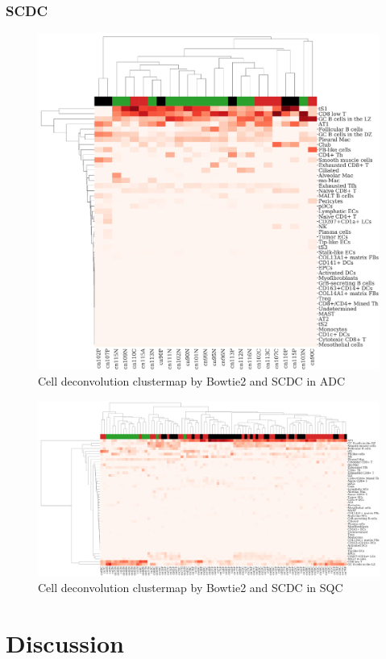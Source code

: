 \documentclass[a4paper]{article}
\begin{document}
            \subsubsection{SCDC}
                \begin{figure}[htbp]
                    \centering
                    \includegraphics[width=0.6 \linewidth]{figures/SCDC/clustermap/Bowtie2.ADC.cluster.pdf}
                    \caption{Cell deconvolution clustermap by Bowtie2 and SCDC in ADC}
                    \label{fig:Deconvolution-SCDC-Bowtie2-cluster-ADC}
                \end{figure}

                \begin{figure}[htbp]
                    \centering
                    \includegraphics[width=\linewidth]{figures/SCDC/clustermap/Bowtie2.SQC.cluster.pdf}
                    \caption{Cell deconvolution clustermap by Bowtie2 and SCDC in SQC}
                    \label{fig:Deconvolution-SCDC-Bowtie2-cluster-SQC}
                \end{figure}

    \section{Discussion}

    
    
\end{document}
